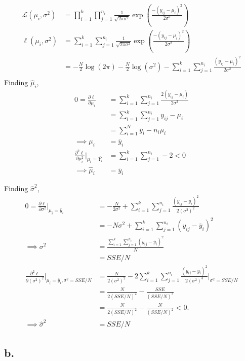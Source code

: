 \documentclass[
  letterpaper,
  DIV=11,
  numbers=noendperiod]{scrreprt}
\begin{document}
\[
\begin{aligned}
\mathcal L (\mu_i, \sigma^2) &= \prod_{i=1}^k \prod_{j=1}^{n_i} \frac{1}{\sqrt{2\pi\sigma^2}} {\exp\left(\frac{-(y_{ij}-\mu_i)^2}{2\sigma^2}\right)} \\
\ell(\mu_i, \sigma^2) &= \sum_{i=1}^k \sum_{j=1}^{n_i} \frac{1}{\sqrt{2\pi\sigma^2}} {\exp\left(\frac{-(y_{ij}-\mu_i)^2}{2\sigma^2}\right)} \\
&= -\frac{N}{2}\log(2\pi)-\frac{N}{2}\log(\sigma^2)-\sum_{i=1}^k \sum_{j=1}^{n_i}  \frac{(y_{ij}-\mu_i)^2}{2\sigma^2} \\
\end{aligned}
\] Finding \(\hat \mu_i\), \[
\begin{aligned}
0 =\frac{\partial \ell}{\partial \mu_i}&=\sum_{i=1}^k \sum_{j=1}^{n_i}  \frac{2(y_{ij}-\mu_i)}{2\sigma^2} \\
&=\sum_{i=1}^k \sum_{j=1}^{n_i}  y_{ij}-\mu_i \\
&= \sum_{i=1}^N \bar y_i- n_i\mu_i \\
\implies \mu_i &= \bar y_i \\
\frac{\partial^2 \ell}{\partial \mu_i^2} \bigg|_{\mu_i= \bar{Y_i}}&=\sum_{i=1}^k \sum_{j=1}^{n_i}  -2 <0 \\
\implies \hat \mu_i &= \bar y_i 
\end{aligned}
\]

Finding \(\hat \sigma^2\), \[
\begin{aligned}
0 =\frac{\partial \ell}{\partial \sigma^2} \bigg|_{\mu_i = \bar y_i}&=-\frac{N}{2\sigma^2}+\sum_{i=1}^k \sum_{j=1}^{n_i}  \frac{(y_{ij}-\bar y_i)^2}{2(\sigma^2)^2} \\
&=-N\sigma^2+\sum_{i=1}^k \sum_{j=1}^{n_i}(y_{ij}-\bar y_i)^2 \\
\implies \sigma^2&=\frac{\sum_{i=1}^k \sum_{j=1}^{n_i}(y_{ij}-\bar y_i)^2}{N} \\
&= SSE/N \\
\frac{\partial^2 \ell}{\partial \left(\sigma^2 \right)^2} \bigg|_{\mu_i = \bar y_i, \sigma^2 = SSE/N}&=\frac{N}{2(\sigma^2)^2}-2\sum_{i=1}^k \sum_{j=1}^{n_i}  \frac{(y_{ij}-\bar y_i)^2}{2(\sigma^2)^3}  \bigg|_{\sigma^2 = SSE/N} \\
&=\frac{N}{2(SSE/N)^2}-\frac{SSE}{(SSE/N)^3} \\
&=\frac{N}{2(SSE/N)^2}-\frac{N}{(SSE/N)^2} <0. \\
\implies \hat \sigma^2 &= SSE/N
\end{aligned}
\] \newpage 

\hypertarget{b.}{%
\subsection{b.}\label{b.}}
\end{document}
